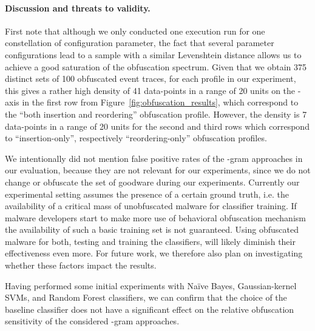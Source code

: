 \documentclass{llncs}
\newcommand{\done}[1]{}
\begin{document}
\paragraph{Discussion and threats to validity.}
First note that although we only conducted one execution run for one constellation 
of configuration parameter, the fact that several parameter configurations 
lead to a sample with a similar Levenshtein distance allows us to achieve a 
good saturation of the obfuscation spectrum. Given that we obtain 375 distinct 
sets of 100 obfuscated event traces, for each profile in our experiment, this gives a 
rather high density of 41 data-points in a range of 20 units on the -axis in the first row from Figure~\ref{fig:obfuscation_results}, which correspond to the ``both insertion and reordering'' obfuscation profile. However, the density is 7 data-points in a range of 20 units for the second and third rows which correspond to ``insertion-only'', respectively ``reordering-only'' obfuscation profiles.
\done{TW: make point more clear that we did not need more runs as we were mainly interested in the obfuscation effects and not so much in the causing parameters and the same effect could be achieved by a variety of different configuration settings}




We intentionally did not mention false positive rates of the -gram approaches in our evaluation, because they are not relevant for our experiments, since we do not change or obfuscate the set of goodware during our experiments. Currently our experimental setting assumes the presence of a certain ground truth, i.e. the availability of a critical mass of unobfuscated malware for classifier training. If malware developers start to make more use of behavioral obfuscation mechanism the availability of such a basic training set is not guaranteed. Using obfuscated malware for both, testing and training the classifiers, will likely diminish their effectiveness even more. For future work, we therefore also plan on investigating whether these factors impact the results. 


Having performed some initial experiments with Na{\"i}ve Bayes, Gaussian-kernel SVMs, and Random Forest classifiers, we can confirm that the choice of the baseline classifier does not have a significant effect on the relative obfuscation sensitivity of the considered -gram approaches.
\end{document}

